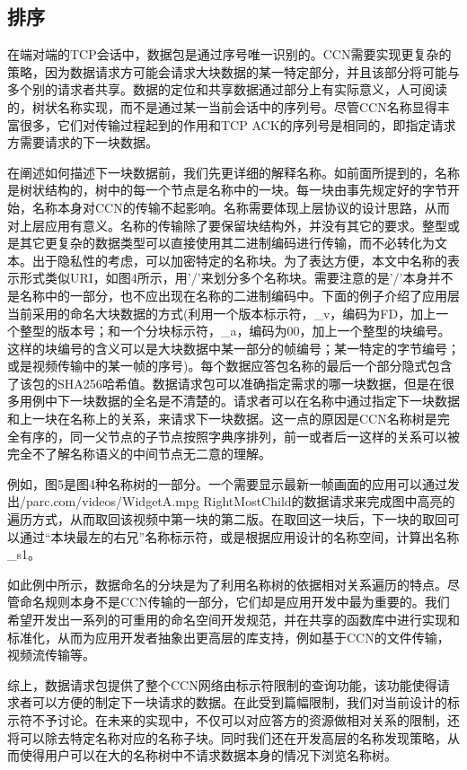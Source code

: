 \subsection{排序}
\par
在端对端的TCP会话中，数据包是通过序号唯一识别的。CCN需要实现更复杂的策略，因为数据请求方可能会请求大块数据的某一特定部分，并且该部分将可能与多个别的请求者共享。数据的定位和共享数据通过部分上有实际意义，人可阅读的，树状名称实现，而不是通过某一当前会话中的序列号。尽管CCN名称显得丰富很多，它们对传输过程起到的作用和TCP ACK的序列号是相同的，即指定请求方需要请求的下一块数据。
\par
在阐述如何描述下一块数据前，我们先更详细的解释名称。如前面所提到的，名称是树状结构的，树中的每一个节点是名称中的一块。每一块由事先规定好的字节开始，名称本身对CCN的传输不起影响。名称需要体现上层协议的设计思路，从而对上层应用有意义。名称的传输除了要保留块结构外，并没有其它的要求。整型或是其它更复杂的数据类型可以直接使用其二进制编码进行传输，而不必转化为文本。出于隐私性的考虑，可以加密特定的名称块。为了表达方便，本文中名称的表示形式类似URI，如图4所示，用’/’来划分多个名称块。需要注意的是’/’本身并不是名称中的一部分，也不应出现在名称的二进制编码中。下面的例子介绍了应用层当前采用的命名大块数据的方式(利用一个版本标示符，\_v，编码为FD，加上一个整型的版本号；和一个分块标示符，\_a，编码为00，加上一个整型的块编号。这样的块编号的含义可以是大块数据中某一部分的帧编号；某一特定的字节编号；或是视频传输中的某一帧的序号)。每个数据应答包名称的最后一个部分隐式包含了该包的SHA256哈希值。数据请求包可以准确指定需求的哪一块数据，但是在很多用例中下一块数据的全名是不清楚的。请求者可以在名称中通过指定下一块数据和上一块在名称上的关系，来请求下一块数据。这一点的原因是CCN名称树是完全有序的，同一父节点的子节点按照字典序排列，前一或者后一这样的关系可以被完全不了解名称语义的中间节点无二意的理解。
\par
例如，图5是图4种名称树的一部分。一个需要显示最新一帧画面的应用可以通过发出/parc.com/videos/WidgetA.mpg RightMostChild的数据请求来完成图中高亮的遍历方式，从而取回该视频中第一块的第二版。在取回这一块后，下一块的取回可以通过“本块最左的右兄”名称标示符，或是根据应用设计的名称空间，计算出名称\_s1。
\par
如此例中所示，数据命名的分块是为了利用名称树的依据相对关系遍历的特点。尽管命名规则本身不是CCN传输的一部分，它们却是应用开发中最为重要的。我们希望开发出一系列的可重用的命名空间开发规范，并在共享的函数库中进行实现和标准化，从而为应用开发者抽象出更高层的库支持，例如基于CCN的文件传输，视频流传输等。
\par
综上，数据请求包提供了整个CCN网络由标示符限制的查询功能，该功能使得请求者可以方便的制定下一块请求的数据。在此受到篇幅限制，我们对当前设计的标示符不予讨论。在未来的实现中，不仅可以对应答方的资源做相对关系的限制，还将可以除去特定名称对应的名称子块。同时我们还在开发高层的名称发现策略，从而使得用户可以在大的名称树中不请求数据本身的情况下浏览名称树。

